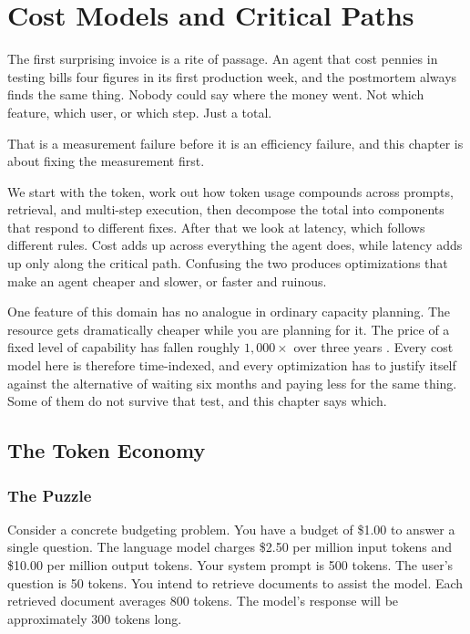 \chapter{Cost Models and Critical Paths}
\label{ch:cost}

The first surprising invoice is a rite of passage. An agent that cost pennies in testing bills four figures in its first production week, and the postmortem always finds the same thing. Nobody could say where the money went. Not which feature, which user, or which step. Just a total.

That is a measurement failure before it is an efficiency failure, and this chapter is about fixing the measurement first.

We start with the token, work out how token usage compounds across prompts, retrieval, and multi-step execution, then decompose the total into components that respond to different fixes. After that we look at latency, which follows different rules. Cost adds up across everything the agent does, while latency adds up only along the critical path. Confusing the two produces optimizations that make an agent cheaper and slower, or faster and ruinous.

One feature of this domain has no analogue in ordinary capacity planning. The resource gets dramatically cheaper while you are planning for it. The price of a fixed level of capability has fallen roughly $1{,}000\times$ over three years \cite{llmflation2024}. Every cost model here is therefore time-indexed, and every optimization has to justify itself against the alternative of waiting six months and paying less for the same thing. Some of them do not survive that test, and this chapter says which.

\section{The Token Economy}

\subsection{The Puzzle}

Consider a concrete budgeting problem. You have a budget of \$1.00 to answer a single question. The language model charges \$2.50 per million input tokens and \$10.00 per million output tokens. Your system prompt is 500 tokens. The user's question is 50 tokens. You intend to retrieve documents to assist the model. Each retrieved document averages 800 tokens. The model’s response will be approximately 300 tokens long.

